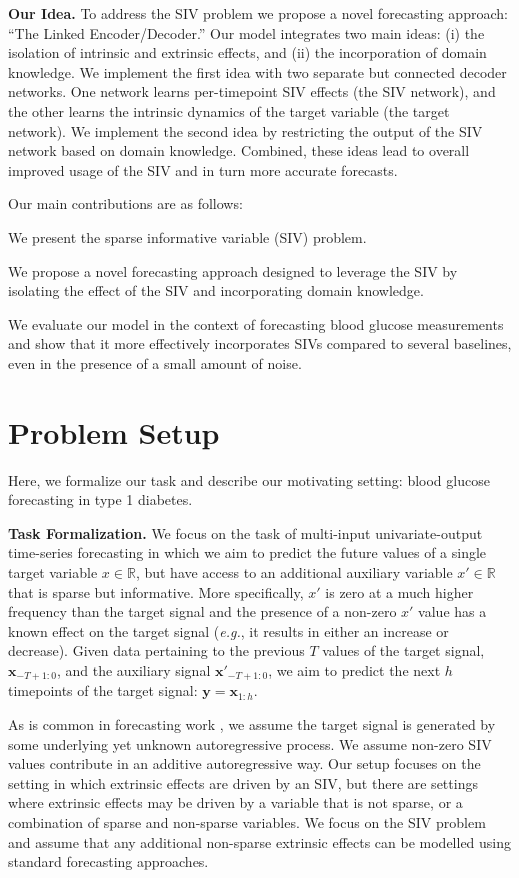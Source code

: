 \documentclass[letterpaper]{article}
\begin{document}
\textbf{Our Idea.} To address the SIV problem we propose a novel forecasting approach: ``The Linked Encoder/Decoder.''  Our model integrates two main ideas: (i) the isolation of intrinsic and extrinsic effects, and (ii) the incorporation of domain knowledge. We implement the first idea with two separate but connected decoder networks. One network learns per-timepoint SIV effects (the SIV network), and the other learns the intrinsic dynamics of the target variable (the target network). We implement the second idea by restricting the output of the SIV network based on domain knowledge. Combined, these ideas lead to overall improved usage of the SIV and in turn more accurate forecasts.

Our main contributions are as follows:


We present the sparse informative variable (SIV) problem.

We propose a novel forecasting approach designed to  leverage the SIV by isolating the effect of the SIV and incorporating domain knowledge.

We evaluate our model in the context of forecasting blood glucose measurements and show that it more effectively incorporates SIVs compared to several baselines, even in the presence of a small amount of noise.




\section{Problem Setup}
Here, we formalize our task and describe our motivating setting: blood glucose forecasting in type 1 diabetes.

\textbf{Task Formalization.} We focus on the task of multi-input univariate-output time-series forecasting in which we aim to predict the future values of a single target variable $x\in\mathbb{R}$, but have access to an additional auxiliary variable $x'\in\mathbb{R}$ that is sparse but informative. More specifically, $x'$ is zero at a much higher frequency than the target signal and the presence of a non-zero $x'$ value has a known effect on the target signal (\textit{e.g.}, it results in either an increase or decrease). Given data pertaining to the previous $T$ values of the target signal, $\mathbf{x}_{-T+1:0}$, and the auxiliary signal $\mathbf{x}'_{-T+1:0}$, we aim to predict the next $h$ timepoints of the target signal: $\mathbf{y}=\mathbf{x}_{1:h}$.


As is common in forecasting work \cite{bbook}, we assume the target signal is generated by some underlying yet unknown autoregressive process. We assume  non-zero SIV values contribute in an additive autoregressive way.  Our setup focuses on the setting in which extrinsic effects are driven by an SIV, but there are settings where extrinsic effects may be driven by a variable that is not sparse, or a combination of sparse and non-sparse variables.  We focus on the SIV problem and assume that any additional non-sparse extrinsic effects can be modelled using standard forecasting approaches.
\end{document}
